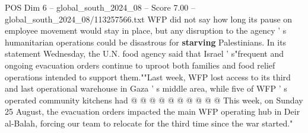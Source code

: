 \begin{textsample}{POS Dim 6 – global\_south\_2024\_08 – Score 7.00 – global\_south\_2024\_08/113257566.txt}
WFP did not say how long its pause on employee movement would stay in place, but any disruption to the agency ' s humanitarian operations could be disastrous for \textbf{starving} Palestinians.
In its statement Wednesday, the U.N. food agency said that Israel ' s"frequent and ongoing evacuation orders continue to uproot both families and food relief operations intended to support them.""Last week, WFP lost access to its third and last operational warehouse in Gaza ' s middle area, while five of WFP ' s operated community kitchens had @ @ @ @ @ @ @ @ @ @ This week, on Sunday 25 August, the evacuation orders impacted the main WFP operating hub in Deir al-Balah, forcing our team to relocate for the third time since the war started."

\end{textsample}
